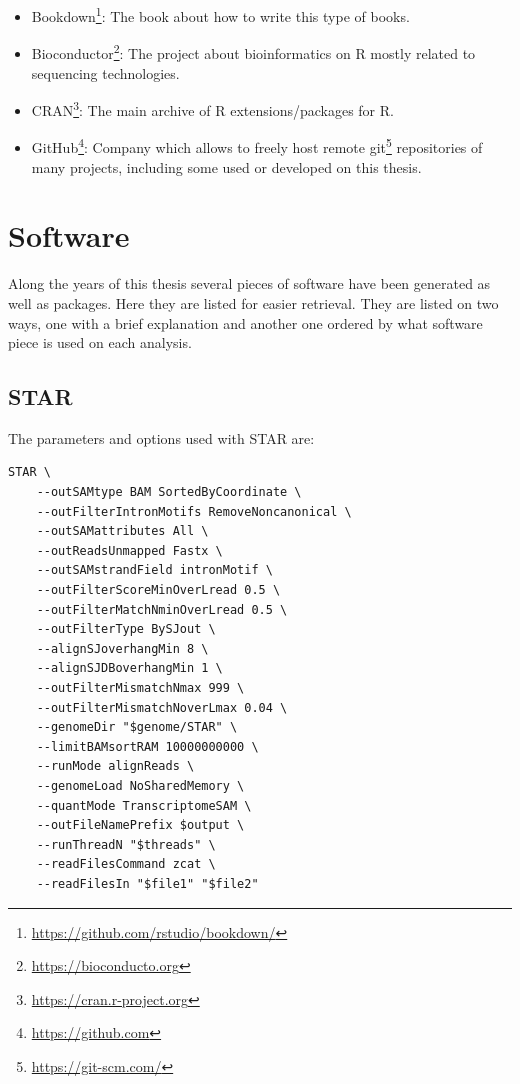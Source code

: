 \documentclass[
  12pt,
  a4paper,
  twoside,
  openright]{book}
\DeclareRobustCommand{\href}[2]{#2\footnote{\url{#1}}}
\begin{document}
\begin{itemize}
\item
  \href{https://github.com/rstudio/bookdown/}{Bookdown}: The book about how to write this type of books.
\item
  \href{https://bioconducto.org}{Bioconductor}: The project about bioinformatics on R mostly related to sequencing technologies.
\item
  \href{https://cran.r-project.org}{CRAN}: The main archive of R extensions/packages for R.
\item
  \href{https://github.com}{GitHub}: Company which allows to freely host remote \href{https://git-scm.com/}{git} repositories of many projects, including some used or developed on this thesis.
\end{itemize}

\hypertarget{software}{%
\chapter{Software}\label{software}}

Along the years of this thesis several pieces of software have been generated as well as packages.
Here they are listed for easier retrieval.
They are listed on two ways, one with a brief explanation and another one ordered by what software piece is used on each analysis.

\hypertarget{star}{%
\section{STAR}\label{star}}

The parameters and options used with STAR are:

\begin{verbatim}
STAR \
    --outSAMtype BAM SortedByCoordinate \
    --outFilterIntronMotifs RemoveNoncanonical \
    --outSAMattributes All \
    --outReadsUnmapped Fastx \
    --outSAMstrandField intronMotif \
    --outFilterScoreMinOverLread 0.5 \
    --outFilterMatchNminOverLread 0.5 \
    --outFilterType BySJout \
    --alignSJoverhangMin 8 \
    --alignSJDBoverhangMin 1 \
    --outFilterMismatchNmax 999 \
    --outFilterMismatchNoverLmax 0.04 \
    --genomeDir "$genome/STAR" \
    --limitBAMsortRAM 10000000000 \
    --runMode alignReads \
    --genomeLoad NoSharedMemory \
    --quantMode TranscriptomeSAM \
    --outFileNamePrefix $output \
    --runThreadN "$threads" \
    --readFilesCommand zcat \
    --readFilesIn "$file1" "$file2"
\end{verbatim}
\end{document}
